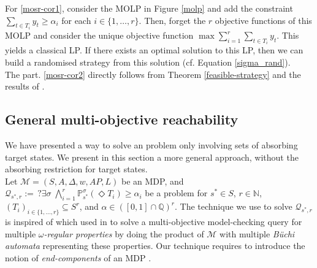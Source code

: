 \begin{proof2}
  For \ref{mosr-cor1}, consider the MOLP in Figure \ref{molp} and add the constraint $\sum_{t \in T_i} y_t \geq \alpha_i$ for each $i \in \{1, \dots, r\}$. Then,
  forget the $r$ objective functions of this MOLP and consider the unique objective function $\max \sum_{i=1}^r\sum_{t \in T_i} y_t$.
  This yields a classical LP. If there exists an optimal solution to this LP, then we can
  build a randomised strategy from this solution (cf. Equation \ref{sigma_rand}).\\
  The part. \ref{mosr-cor2} directly follows from Theorem \ref{feasible-strategy} and the results of \cite{DBLP:conf/focs/PapadimitriouY00}.

\end{proof2}

\subsection{General multi-objective reachability}
We have presented a way to solve an \MOSR{} problem only involving sets of absorbing target states.
We present in this section a more general approach, without the absorbing restriction for target states.\\

Let $\mathcal{M}=(S, A, \Delta, w, AP, L)$ be an MDP, and
$
  \mathcal{Q}_{s^*, r} := \,?\exists \sigma\; \bigwedge_{i=1}^r \mathbb{P}^\sigma_{s^*}(\Diamond T_i) \geq \alpha_i
$
be a \MOSR{} problem for $s^* \in S$, $r \in \mathbb{N}$, $(T_i)_{i \in \{1, \dots, r\}} \subseteq S^r$, and $\alpha \in ([0, 1] \cap \mathbb{Q})^r$.
The technique we use to solve $\mathcal{Q}_{s^*, r}$ is inspired of which used in \cite{DBLP:journals/lmcs/EtessamiKVY08} to solve a multi-objective model-checking query for multiple \textit{$\omega$-regular properties} by doing the product of $\mathcal{M}$ with multiple \textit{Büchi automata} representing these properties.
Our technique requires to introduce the notion of
\textit{end-components} of an MDP \cite{PMC}.

